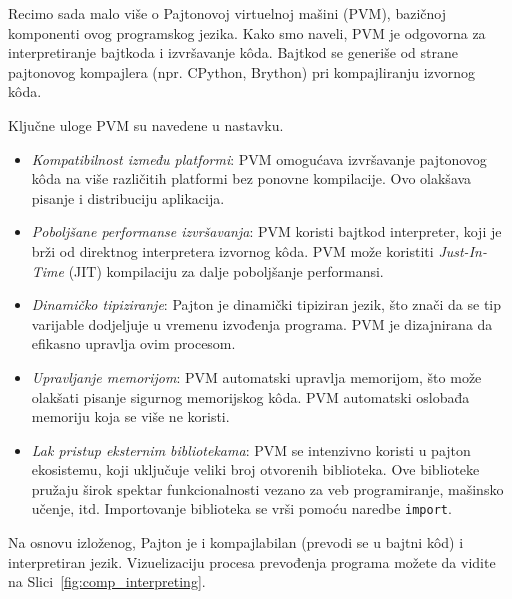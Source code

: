 
Recimo sada malo više o Pajtonovoj virtuelnoj mašini (PVM), bazičnoj komponenti ovog programskog jezika. Kako smo naveli, PVM je odgovorna za interpretiranje bajtkoda i izvršavanje k\^oda. Bajtkod se generiše od strane pajtonovog kompajlera (npr. CPython, Brython) pri kompajliranju izvornog k\^oda.

Ključne uloge PVM su navedene u nastavku. 
\begin{itemize}
\item \textit{Kompatibilnost između platformi}: PVM omogućava izvršavanje pajtonovog k\^oda na više različitih platformi bez ponovne kompilacije. Ovo olakšava pisanje i distribuciju aplikacija.
\item \textit{Poboljšane performanse izvršavanja}: PVM koristi bajtkod  interpreter, koji je brži od direktnog interpretera izvornog k\^oda. PVM može koristiti \textit{Just-In-Time} (JIT) kompilaciju za dalje poboljšanje performansi.
\item \textit{Dinamičko tipiziranje}: Pajton je dinamički tipiziran jezik, što znači da se tip varijable dodjeljuje u vremenu izvođenja programa. PVM je dizajnirana da efikasno upravlja ovim procesom.
\item  \textit{Upravljanje memorijom}: PVM automatski upravlja memorijom, što može olakšati pisanje sigurnog memorijskog k\^oda. PVM  automatski oslobađa memoriju koja se više ne koristi.
\item \textit{Lak pristup eksternim bibliotekama}: PVM se intenzivno koristi u pajton ekosistemu, koji uključuje veliki broj otvorenih biblioteka. Ove biblioteke pružaju širok spektar funkcionalnosti vezano za  veb programiranje, mašinsko učenje, itd. Importovanje biblioteka se vrši pomoću naredbe \texttt{import}. 
\end{itemize}


Na osnovu izloženog, Pajton je i kompajlabilan (prevodi se u bajtni k\^od) i interpretiran jezik. 
Vizuelizaciju procesa prevođenja programa možete da vidite na Slici~\ref{fig:comp_interpreting}.


